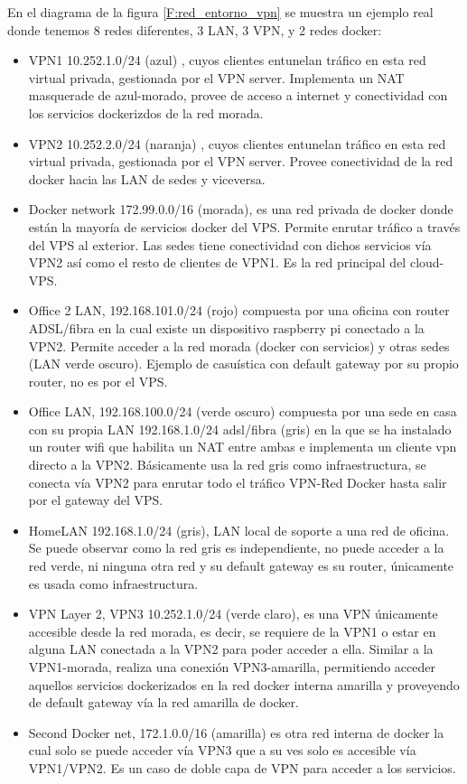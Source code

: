 En el diagrama de la figura \ref{F:red_entorno_vpn} se muestra un ejemplo real donde tenemos 8 redes diferentes, 3 LAN, 3 VPN, y 2 redes docker:
\begin{itemize}
    \item VPN1 10.252.1.0/24 (azul) , cuyos clientes entunelan tráfico en esta red virtual privada, gestionada por el VPN server. Implementa un NAT masquerade de azul-morado, provee de acceso a internet y conectividad con los servicios dockerizdos de la red morada.
    \item VPN2 10.252.2.0/24 (naranja) , cuyos clientes entunelan tráfico en esta red virtual privada, gestionada por el VPN server. Provee conectividad de la red docker hacia las LAN de sedes y viceversa.
    \item Docker network 172.99.0.0/16 (morada), es una red privada de docker donde están la mayoría de  servicios docker del VPS. Permite enrutar tráfico a través del VPS al exterior. Las sedes tiene conectividad con dichos servicios vía VPN2 así como el resto de clientes de VPN1. Es la red principal del cloud-VPS.
    \item Office 2 LAN, 192.168.101.0/24 (rojo) compuesta por una oficina con router ADSL/fibra en la cual existe un dispositivo raspberry pi conectado a la VPN2. Permite acceder a la red morada (docker con servicios) y otras sedes (LAN verde oscuro). Ejemplo de casuística con default gateway por su propio router, no es por el VPS.
    \item Office LAN, 192.168.100.0/24 (verde oscuro) compuesta por una sede en casa con su propia LAN 192.168.1.0/24 adsl/fibra (gris) en la que se ha instalado un router wifi que habilita un NAT entre ambas e implementa un cliente vpn directo a la VPN2. Básicamente usa la red gris como infraestructura, se conecta vía VPN2 para enrutar todo el tráfico VPN-Red Docker hasta salir por el gateway del VPS. 
    \item  HomeLAN 192.168.1.0/24 (gris), LAN local de soporte a una red de oficina. Se puede observar como la red gris es independiente, no puede acceder a la red verde, ni ninguna otra red y su default gateway es su router, únicamente es usada como infraestructura.
    \item VPN Layer 2, VPN3 10.252.1.0/24 (verde claro), es una VPN únicamente accesible desde la red morada, es decir, se requiere de la VPN1 o estar en alguna LAN conectada a la VPN2 para poder acceder a ella. Similar a la VPN1-morada, realiza una conexión VPN3-amarilla, permitiendo acceder aquellos servicios dockerizados en la red docker interna amarilla y proveyendo de default gateway vía la red amarilla de docker.
    \item Second Docker net, 172.1.0.0/16 (amarilla) es otra red interna de docker la cual solo se puede acceder vía VPN3 que a su ves solo es accesible vía VPN1/VPN2. Es un caso de doble capa de VPN para acceder a los servicios.
    

\end{itemize}
